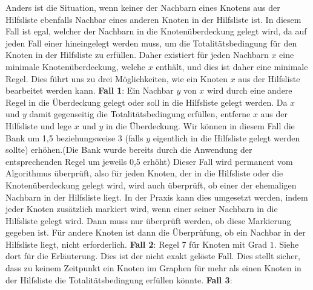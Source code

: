 \documentclass[12pt,onecolumn, notitlepage]{scrartcl}
\begin{document}
Anders ist die Situation, wenn keiner der Nachbarn eines Knotens aus der Hilfsliste ebenfalls Nachbar eines anderen Knoten in der Hilfsliste ist. In diesem Fall ist egal, welcher der Nachbarn in die Knotenüberdeckung gelegt wird, da auf jeden Fall einer hineingelegt werden muss, um die Totalitätsbedingung für den Knoten in der Hilfsliste zu erfüllen. Daher existiert für jeden Nachbarn $x$ eine minimale Knotenüberdeckung, welche $x$ enthält, und dies ist daher eine minimale Regel. Dies führt uns zu drei Möglichkeiten, wie ein Knoten $x$ aus der Hilfsliste bearbeitet werden kann.\newline \newline
\textbf{Fall 1}:\newline
Ein Nachbar $y$ von $x$ wird durch eine andere Regel in die Überdeckung gelegt oder soll in die Hilfsliste gelegt werden. Da $x$ und $y$ damit gegenseitig die Totalitätsbedingung erfüllen, entferne $x$ aus der Hilfsliste und lege $x$ und $y$ in die Überdeckung. Wir können in diesem Fall die Bank um 1,5 beziehungsweise 3 (falls $y$ eigentlich in die Hilfsliste gelegt werden sollte) erhöhen.(Die Bank wurde bereits durch die Anwendung der entsprechenden Regel um jeweils 0,5 erhöht)
Dieser Fall wird permanent vom Algorithmus überprüft, also für jeden Knoten, der in die Hilfsliste oder die Knotenüberdeckung gelegt wird, wird auch überprüft, ob einer der ehemaligen Nachbarn in der Hilfsliste liegt. In der Praxis kann dies umgesetzt werden, indem jeder Knoten zusätzlich markiert wird, wenn einer seiner Nachbarn in die Hilfsliste gelegt wird. Dann muss nur überprüft werden, ob diese Markierung gegeben ist. Für andere Knoten ist dann die Überprüfung, ob ein Nachbar in der Hilfsliste liegt, nicht erforderlich.\newline\newline
\textbf{Fall 2}:\newline
Regel 7 für Knoten mit Grad $1$. Siehe dort für die Erläuterung. Dies ist der nicht exakt gelöste Fall. Dies stellt sicher, dass zu keinem Zeitpunkt ein Knoten im Graphen für mehr als einen Knoten in der Hilfsliste die Totalitätsbedingung erfüllen könnte.\newline\newline
\textbf{Fall 3}: \newline
\end{document}
